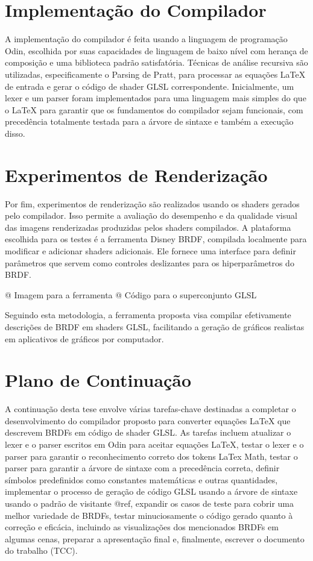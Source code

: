 \documentclass[english, 
               brazil, 
               bsc] %
               {dcomp-abntex2}
\begin{document}
\section{Implementação do Compilador}

A implementação do compilador é feita usando a linguagem de programação Odin, escolhida por suas capacidades de linguagem de baixo nível com herança de composição e uma biblioteca padrão satisfatória. Técnicas de análise recursiva são utilizadas, especificamente o Parsing de Pratt, para processar as equações LaTeX de entrada e gerar o código de shader GLSL correspondente. Inicialmente, um lexer e um parser foram implementados para uma linguagem mais simples do que o LaTeX para garantir que os fundamentos do compilador sejam funcionais, com precedência totalmente testada para a árvore de sintaxe e também a execução disso.

\section{Experimentos de Renderização}

Por fim, experimentos de renderização são realizados usando os shaders gerados pelo compilador. Isso permite a avaliação do desempenho e da qualidade visual das imagens renderizadas produzidas pelos shaders compilados. A plataforma escolhida para os testes é a ferramenta Disney BRDF, compilada localmente para modificar e adicionar shaders adicionais. Ele fornece uma interface para definir parâmetros que servem como controles deslizantes para os hiperparâmetros do BRDF.

@ Imagem para a ferramenta
@ Código para o superconjunto GLSL

Seguindo esta metodologia, a ferramenta proposta visa compilar efetivamente descrições de BRDF em shaders GLSL, facilitando a geração de gráficos realistas em aplicativos de gráficos por computador.
\section{Plano de Continuação}

A continuação desta tese envolve várias tarefas-chave destinadas a completar o desenvolvimento do compilador proposto para converter equações LaTeX que descrevem BRDFs em código de shader GLSL. As tarefas incluem atualizar o lexer e o parser escritos em Odin para aceitar equações LaTeX, testar o lexer e o parser para garantir o reconhecimento correto dos tokens LaTex Math, testar o parser para garantir a árvore de sintaxe com a precedência correta, definir símbolos predefinidos como constantes matemáticas e outras quantidades, implementar o processo de geração de código GLSL usando a árvore de sintaxe usando o padrão de visitante @ref, expandir os casos de teste para cobrir uma melhor variedade de BRDFs, testar minuciosamente o código gerado quanto à correção e eficácia, incluindo as visualizações dos mencionados BRDFs em algumas cenas, preparar a apresentação final e, finalmente, escrever o documento do trabalho (TCC).
\end{document}

